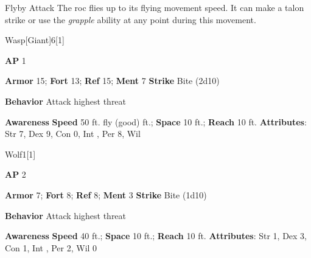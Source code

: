 \begin{freeability}{Flyby Attack}
The roc flies up to its flying movement speed.
It can make a talon strike or use the \textit{grapple} ability at any point during this movement.
\end{freeability}

\begin{monsection}{Wasp}[Giant]{6}[1]
\vspace{-1em}\vspace{-1em}
\begin{spellcontent}
\begin{spelltargetinginfo}
{\textbf{AP} 1}

\pari \textbf{Armor} 15;
\textbf{Fort} 13;
\textbf{Ref} 15;
\textbf{Ment} 7
\pari \textbf{Strike} Bite  (2d10)



\pari \textbf{Behavior} Attack highest threat
\end{spelltargetinginfo}
\end{spellcontent}

\begin{monsterfooter}
\pari \textbf{Awareness} 
\pari \textbf{Speed} 50 ft. fly (good) ft.;
\textbf{Space} 10 ft.;
\textbf{Reach} 10 ft.
\pari \textbf{Attributes}:
Str 7,
Dex 9,
Con 0,
Int ,
Per 8,
Wil 
\end{monsterfooter}
\end{monsection}

\begin{monsection}{Wolf}{1}[1]
\vspace{-1em}\vspace{-1em}
\begin{spellcontent}
\begin{spelltargetinginfo}
{\textbf{AP} 2}

\pari \textbf{Armor} 7;
\textbf{Fort} 8;
\textbf{Ref} 8;
\textbf{Ment} 3
\pari \textbf{Strike} Bite  (1d10)



\pari \textbf{Behavior} Attack highest threat
\end{spelltargetinginfo}
\end{spellcontent}

\begin{monsterfooter}
\pari \textbf{Awareness} 
\pari \textbf{Speed} 40 ft.;
\textbf{Space} 10 ft.;
\textbf{Reach} 10 ft.
\pari \textbf{Attributes}:
Str 1,
Dex 3,
Con 1,
Int ,
Per 2,
Wil 0
\end{monsterfooter}
\end{monsection}

